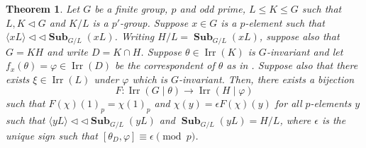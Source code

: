 \documentclass[12pt]{amsart}
\DeclareMathOperator{\Sub}{\mathbf{Sub}}
\DeclareMathOperator{\Irr}{Irr}
\theoremstyle{remark}
\theoremstyle{definition}
\theoremstyle{plain}
\newtheorem{thm}{Theorem}[section]
\theoremstyle{definition}
\numberwithin{equation}{section}
\begin{document}
\begin{thm}
	\label{Part2}
	Let $G$ be a finite group, $p$ and odd prime, $L \leq K \leq G$ such that $L, K \lhd G$ and $K/L$ is a $p'$-group. Suppose $x \in G$ is a $p$-element such that $\langle xL \rangle {\triangleleft}{\triangleleft} \Sub_{G/L}(xL)$. Writing $H/L = \Sub_{G/L}(xL)$, suppose also that $G = KH$ and write $D = K \cap H$. Suppose $\theta \in \Irr(K)$ is $G$-invariant and let $f_x(\theta) = \varphi \in \Irr(D)$ be the correspondent of $\theta$ as in . Suppose also that there exists $\xi \in \Irr(L)$ under $\varphi$ which is $G$-invariant. Then, there exists a bijection
	\begin{equation*}
		F: \Irr(G \mid \theta) \to \Irr(H \mid \varphi)
	\end{equation*}
	such that $F(\chi)(1)_p = \chi(1)_p$ and $\chi(y) = \epsilon F(\chi)(y)$ for all $p$-elements $y$ such that $\langle yL \rangle {\triangleleft}{\triangleleft} \Sub_{G/L}(yL)$ and $\Sub_{G/L}(yL) = H/L$, where $\epsilon$ is the unique sign such that $[\theta_D, \varphi] \equiv \epsilon \pmod{p}$.
\end{thm}
\end{document}
